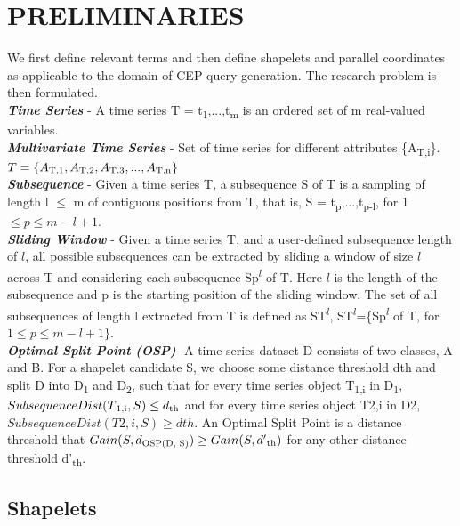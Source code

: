 \documentclass[conference]{IEEEtran}  %
\begin{document}
\section{PRELIMINARIES}
We first define relevant terms and then define shapelets and parallel coordinates as applicable to the domain of CEP query generation. The research problem is then formulated.
\medskip\\
\textbf{\textit{Time Series}} - A time series T = t\textsubscript{1},...,t\textsubscript{m} is an ordered set of m real-valued variables.
\smallskip\\
\textbf{\textit{Multivariate Time Series}} - Set of time series for different attributes \{A\textsubscript{T,i}\}. \(T = \{A\textsubscript{T,1},A\textsubscript{T,2},A\textsubscript{T,3},...,A\textsubscript{T,n}\}\)
\smallskip\\
\textbf{\textit{Subsequence}} - Given a time series T, a subsequence S of T is a sampling of length l \(\leq\) m of contiguous positions from T, that is, S = t\textsubscript{p},...,t\textsubscript{p-l}, for 1 \(\leq p \leq m - l + 1\).
\smallskip\\
\textbf{\textit{Sliding Window}} - Given a time series T, and a user-defined subsequence length of \(l\), all possible subsequences can be extracted by sliding a window of size  \(l\) across T and considering each subsequence Sp\textsuperscript{\(l\)} of T. Here \(l\) is the length of the subsequence and p is the starting position of the sliding window. The set of all subsequences of length l extracted from T is defined as ST\textsuperscript{\(l\)}, ST\textsuperscript{\(l\)}=\{Sp\textsuperscript{\(l\)} of T, for \(1 \leq p \leq m - l + 1\}\).
\smallskip\\
\textbf{\textit{Optimal Split Point (OSP)}}- A time series dataset D consists of two classes, A and B. For a shapelet candidate S, we choose some distance threshold dth and split D into D\textsubscript{1} and D\textsubscript{2}, such that for every time series object T\textsubscript{1,i} in D\textsubscript{1}, \(SubsequenceDist(T\textsubscript{1,i}, S)\leq d\textsubscript{th}\) and for every time series object T2,i in D2, \(SubsequenceDist(T2,i,S) \geq dth\). An Optimal Split Point is a distance threshold that \(Gain(S, d\textsubscript{OSP(D, S)}) \geq Gain(S, d'\textsubscript{th})\) for any other distance threshold d'\textsubscript{th}.

\subsection{Shapelets}
\end{document}
